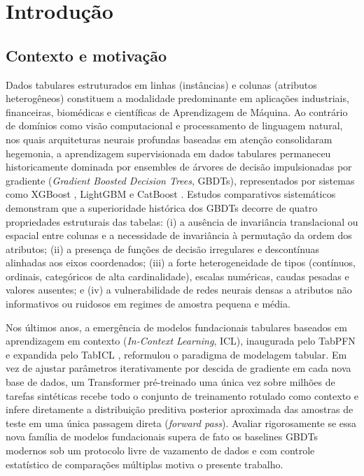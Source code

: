 \documentclass[11pt,a4paper]{article}
\begin{document}
\tableofcontents
\bigskip

\section{Introdução}
\label{sec:intro}

\subsection{Contexto e motivação}

Dados tabulares estruturados em linhas (instâncias) e colunas (atributos heterogêneos) constituem a modalidade predominante em aplicações industriais, financeiras, biomédicas e científicas de Aprendizagem de Máquina. Ao contrário de domínios como visão computacional e processamento de linguagem natural, nos quais arquiteturas neurais profundas baseadas em atenção consolidaram hegemonia, a aprendizagem supervisionada em dados tabulares permaneceu historicamente dominada por ensembles de árvores de decisão impulsionadas por gradiente (\emph{Gradient Boosted Decision Trees}, GBDTs), representados por sistemas como XGBoost \cite{chen2016xgboost}, LightGBM \cite{ke2017lightgbm} e CatBoost \cite{prokhorenkova2018catboost}. Estudos comparativos sistemáticos \cite{grinsztajn2022tree,mcelfresh2023when} demonstram que a superioridade histórica dos GBDTs decorre de quatro propriedades estruturais das tabelas: (i) a ausência de invariância translacional ou espacial entre colunas e a necessidade de invariância à permutação da ordem dos atributos; (ii) a presença de funções de decisão irregulares e descontínuas alinhadas aos eixos coordenados; (iii) a forte heterogeneidade de tipos (contínuos, ordinais, categóricos de alta cardinalidade), escalas numéricas, caudas pesadas e valores ausentes; e (iv) a vulnerabilidade de redes neurais densas a atributos não informativos ou ruidosos em regimes de amostra pequena e média.

Nos últimos anos, a emergência de modelos fundacionais tabulares baseados em aprendizagem em contexto (\emph{In-Context Learning}, ICL), inaugurada pelo TabPFN \cite{hollmann2023tabpfn,hollmann2025tabpfn} e expandida pelo TabICL \cite{qu2025tabicl,qu2026tabiclv2}, reformulou o paradigma de modelagem tabular. Em vez de ajustar parâmetros iterativamente por descida de gradiente em cada nova base de dados, um Transformer pré-treinado uma única vez sobre milhões de tarefas sintéticas recebe todo o conjunto de treinamento rotulado como contexto e infere diretamente a distribuição preditiva posterior aproximada das amostras de teste em uma única passagem direta (\emph{forward pass}). Avaliar rigorosamente se essa nova família de modelos fundacionais supera de fato os baselines GBDTs modernos sob um protocolo livre de vazamento de dados e com controle estatístico de comparações múltiplas motiva o presente trabalho.
\end{document}
